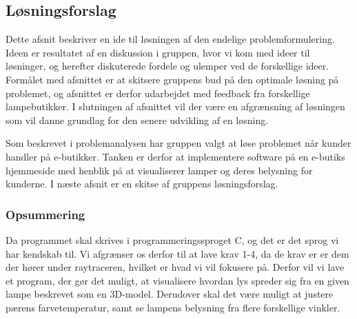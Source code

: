 \subsection{Løsningsforslag}
\label{sec:losning}
Dette afsnit beskriver en ide til løsningen af den endelige problemformulering. Ideen er resultatet af en diskussion i gruppen, hvor vi kom med ideer til løsninger, og herefter diskuterede fordele og ulemper ved de forskellige ideer. Formålet med afsnittet er at skitsere gruppens bud på den optimale løsning på problemet, og afsnittet er derfor udarbejdet med feedback fra forskellige lampebutikker. I slutningen af afsnittet vil der være en afgrænsning af løsningen som vil danne grundlag for den senere udvikling af en løsning.

Som beskrevet i problemanalysen har gruppen valgt at løse problemet når kunder handler på e-butikker. Tanken er derfor at implementere software på en e-butiks hjemmeside med henblik på at visualiserer lamper og deres belysning for kunderne. I næste afsnit er en skitse af gruppens løsningsforslag.





\subsubsection*{Opsummering}

Da programmet skal skrives i programmeringssproget C, og det er det sprog vi har kendskab til. Vi afgrænser os derfor til at lave krav 1-4, da de krav er er dem der hører under raytraceren, hvilket er hvad vi vil fokusere på. Derfor vil vi lave et program, der gør det muligt, at visualisere hvordan lys spreder sig fra en given lampe beskrevet som en 3D-model. Derudover skal det være muligt at justere pærens farvetemperatur, samt se lampens belysning fra flere forskellige vinkler. 
